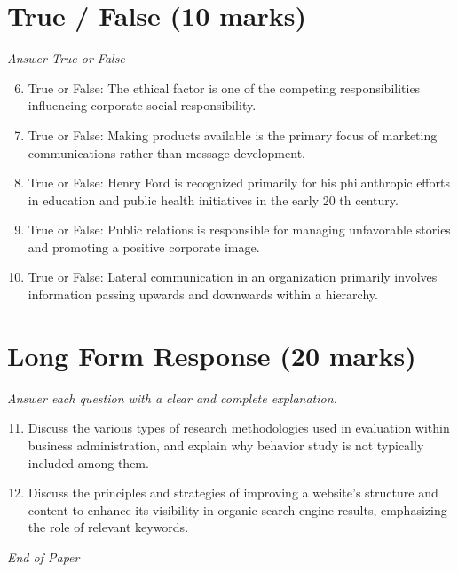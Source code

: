 \documentclass[12pt]{article}
\begin{document}
\section*{True / False (10 marks)}
\textit{Answer True or False}
\begin{enumerate}[label=\arabic*.]
\setcounter{enumi}{5}
\item True or False: The ethical factor is one of the competing responsibilities influencing corporate social responsibility.
\item True or False: Making products available is the primary focus of marketing communications rather than message development.
\item True or False: Henry Ford is recognized primarily for his philanthropic efforts in education and public health initiatives in the early 20 th century.
\item True or False: Public relations is responsible for managing unfavorable stories and promoting a positive corporate image.
\item True or False: Lateral communication in an organization primarily involves information passing upwards and downwards within a hierarchy.
\end{enumerate}

\section*{Long Form Response (20 marks)}
\textit{Answer each question with a clear and complete explanation.}
\begin{enumerate}[label=\arabic*.]
\setcounter{enumi}{10}
\item Discuss the various types of research methodologies used in evaluation within business administration, and explain why behavior study is not typically included among them.
\item Discuss the principles and strategies of improving a website's structure and content to enhance its visibility in organic search engine results, emphasizing the role of relevant keywords.
\end{enumerate}

\vfill
\noindent\textit{End of Paper}
\end{document}
